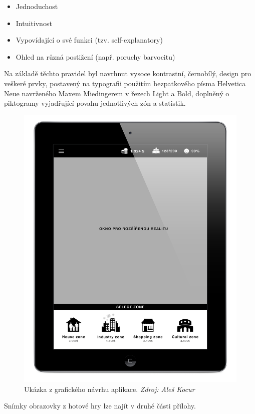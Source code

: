 \documentclass[twoside,12pt]{article}
\begin{document}
\begin{itemize}
\item Jednoduchost
\item Intuitivnost
\item Vypovídající o své funkci (tzv. self-explanatory)
\item Ohled na různá postižení (např. poruchy barvocitu) 
\end{itemize}

Na základě těchto pravidel byl navrhnut vysoce kontrastní, černobílý, design pro veškeré prvky, postavený na typografii použitím bezpatkového písma Helvetica Neue navrženého Maxem Miedingerem v řezech Light a Bold, doplněný o piktogramy vyjadřující povahu jednotlivých zón a statistik.  
 
 \begin{figure}[H]
\centering
    \includegraphics[width=430px, center]{images/ipad-layout.jpg}
\captionsetup{justification=centering}
    \caption[]{Ukázka z grafického návrhu aplikace. \textit{Zdroj: Aleš Kocur}}
    \label{class_diagram}
\end{figure}
 
 Snímky obrazovky z hotové hry lze najít v druhé části přílohy. 
 
 
\end{document}
